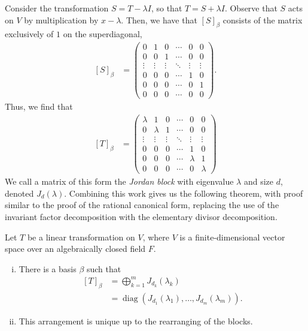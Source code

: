\documentclass[10pt]{mypackage}
\begin{document}
Consider the transformation $S = T-\lambda I$, so that $T = S + \lambda I$. Observe that $S$ acts on $V$ by multiplication by $x-\lambda$. Then, we have that $\left[ S \right]_{\beta}$ consists of the matrix exclusively of $1$ on the superdiagonal,
\begin{align*}
  \left[ S \right]_{\beta} &= \begin{pmatrix}0 & 1 & 0 & \cdots & 0 & 0\\ 0 & 0 & 1 & \cdots & 0 & 0 \\ \vdots & \vdots & \vdots & \ddots & \vdots & \vdots \\ 0 & 0 & 0 & \cdots & 1 & 0 \\ 0 & 0 & 0 & \cdots & 0 & 1 \\ 0 & 0 & 0 & \cdots & 0 & 0\end{pmatrix}.
\end{align*}
Thus, we find that
\begin{align*}
  \left[ T \right]_{\beta} &= \begin{pmatrix}\lambda & 1 & 0 & \cdots & 0 & 0\\ 0 & \lambda & 1 & \cdots & 0 & 0 \\ \vdots & \vdots & \vdots & \ddots & \vdots & \vdots \\ 0 & 0 & 0 & \cdots & 1 & 0 \\ 0 & 0 & 0 & \cdots & \lambda & 1 \\ 0 & 0 & 0 & \cdots & 0 & \lambda\end{pmatrix}
\end{align*}
We call a matrix of this form the \textit{Jordan block} with eigenvalue $\lambda$ and size $d$, denoted $J_d(\lambda)$. Combining this work gives us the following theorem, with proof similar to the proof of the rational canonical form, replacing the use of the invariant factor decomposition with the elementary divisor decomposition.
\begin{theorem}
  Let $T$ be a linear transformation on $V$, where $V$ is a finite-dimensional vector space over an algebraically closed field $F$.
  \begin{enumerate}[(i)]
    \item There is a basis $\beta$ such that
      \begin{align*}
        \left[ T \right]_{\beta} &= \bigoplus_{k=1}^{m} J_{d_k}\left( \lambda_k \right)\\
                                 &= \operatorname{diag}\left( J_{d_1}\left( \lambda_1 \right),\dots,J_{d_m}\left( \lambda_m \right) \right).
      \end{align*}
    \item This arrangement is unique up to the rearranging of the blocks.
  \end{enumerate}
\end{theorem}
\end{document}
